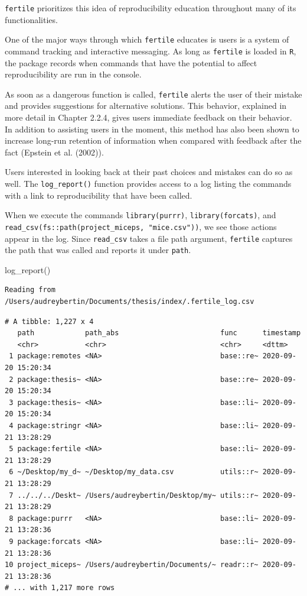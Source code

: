 \documentclass[12pt,twoside]{reedthesis}
\newenvironment{Shaded}{\begin{snugshade}}{\end{snugshade}}
\newcommand{\FunctionTok}[1]{\textcolor[rgb]{0.00,0.00,0.00}{#1}}
\newcommand{\NormalTok}[1]{#1}
\begin{document}
\texttt{fertile} prioritizes this idea of reproducibility education throughout many of its functionalities.

One of the major ways through which \texttt{fertile} educates is users is a system of command tracking and interactive messaging. As long as \texttt{fertile} is loaded in \texttt{R}, the package records when commands that have the potential to affect reproducibility are run in the console.

As soon as a dangerous function is called, \texttt{fertile} alerts the user of their mistake and provides suggestions for alternative solutions. This behavior, explained in more detail in Chapter 2.2.4, gives users immediate feedback on their behavior. In addition to assisting users in the moment, this method has also been shown to increase long-run retention of information when compared with feedback after the fact (Epstein et al. (2002)).

Users interested in looking back at their past choices and mistakes can do so as well. The \texttt{log\_report()} function provides access to a log listing the commands with a link to reproducibility that have been called.

When we execute the commands \texttt{library(purrr)}, \texttt{library(forcats)}, and \texttt{read\_csv(fs::path(\textquotesingle{}project\_miceps\textquotesingle{},\ "mice.csv"))}, we see those actions appear in the log. Since \texttt{read\_csv} takes a file path argument, \texttt{fertile} captures the path that was called and reports it under \texttt{path}.
\begin{Shaded}
\begin{Highlighting}[]
\FunctionTok{log\_report}\NormalTok{()}
\end{Highlighting}
\end{Shaded}
\footnotesize
\begin{verbatim}
Reading from /Users/audreybertin/Documents/thesis/index/.fertile_log.csv
\end{verbatim}
\begin{verbatim}
# A tibble: 1,227 x 4
   path            path_abs                        func      timestamp          
   <chr>           <chr>                           <chr>     <dttm>             
 1 package:remotes <NA>                            base::re~ 2020-09-20 15:20:34
 2 package:thesis~ <NA>                            base::re~ 2020-09-20 15:20:34
 3 package:thesis~ <NA>                            base::li~ 2020-09-20 15:20:34
 4 package:stringr <NA>                            base::li~ 2020-09-21 13:28:29
 5 package:fertile <NA>                            base::li~ 2020-09-21 13:28:29
 6 ~/Desktop/my_d~ ~/Desktop/my_data.csv           utils::r~ 2020-09-21 13:28:29
 7 ../../../Deskt~ /Users/audreybertin/Desktop/my~ utils::r~ 2020-09-21 13:28:29
 8 package:purrr   <NA>                            base::li~ 2020-09-21 13:28:36
 9 package:forcats <NA>                            base::li~ 2020-09-21 13:28:36
10 project_miceps~ /Users/audreybertin/Documents/~ readr::r~ 2020-09-21 13:28:36
# ... with 1,217 more rows
\end{verbatim}
\normalsize
\end{document}
